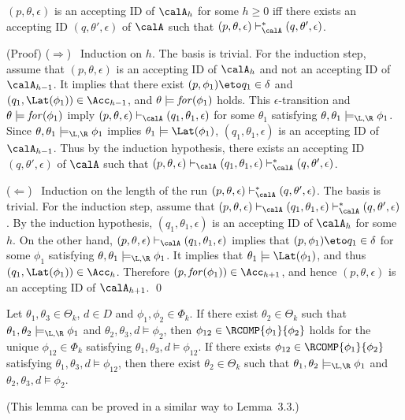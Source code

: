 \begin{lemma}\label{lem:eps1}
$(p,\theta,\epsilon)$ is an accepting ID of $\calA_h$
for some $h\ge0$
iff
there exists an accepting ID $(q,\theta',\epsilon)$ of $\calA$
such that
$(p,\theta,\epsilon)\vdash_{\calA}^* (q,\theta',\epsilon)$.
\end{lemma}
%
(Proof)\quad
($\Rightarrow$) \ Induction on $h$.
The basis is trivial.
For the induction step,
assume that $(p,\theta,\epsilon)$ is an accepting ID of $\calA_h$
and not an accepting ID of $\calA_{h-1}$.
It implies that
there exist ${(p,\phi_1)\eto q_1}\in\delta$ and
$(q_1,\Lat(\phi_1))\in\Acc_{h-1}$, and
$\theta\models\mathit{for}(\phi_1)$ holds.
This $\epsilon$-transition and $\theta\models\mathit{for}(\phi_1)$ imply
$(p,\theta,\epsilon)\vdash_{\calA} (q_1,\theta_1,\epsilon)$
for some $\theta_1$ satisfying $\theta,\theta_1\models_{\L,\R}\phi_1$.
Since $\theta,\theta_1\models_{\L,\R}\phi_1$ implies
$\theta_1\models\Lat(\phi_1)$,
$(q_1,\theta_1,\epsilon)$ is an accepting ID of $\calA_{h-1}$.
Thus by the induction hypothesis,
there exists an accepting ID $(q,\theta',\epsilon)$ of $\calA$
such that
$(p,\theta,\epsilon)\vdash_{\calA} (q_1,\theta_1,\epsilon)
\vdash_{\calA}^* (q,\theta',\epsilon)$.

($\Leftarrow$) \
Induction on the length of the run
$(p,\theta,\epsilon)\vdash_{\calA}^* (q,\theta',\epsilon)$.
The basis is trivial.
For the induction step, assume that
$(p,\theta,\epsilon)\vdash_{\calA}(q_1,\theta_1,\epsilon)
\vdash_{\calA}^* (q,\theta',\epsilon)$.
By the induction hypothesis,
$(q_1,\theta_1,\epsilon)$ is an accepting ID of
$\calA_h$ for some~$h$.
On the other hand,
$(p,\theta,\epsilon)\vdash_{\calA}(q_1,\theta_1,\epsilon)$
implies that
${(p,\phi_1)\eto q_1}\in\delta$ for some $\phi_1$
satisfying $\theta,\theta_1\models_{\L,\R}\phi_1$.
It implies that $\theta_1\models\Lat(\phi_1)$,
and thus $(q_1,\Lat(\phi_1))\in\Acc_h$.
Therefore $(p,\For(\phi_1))\in\Acc_{h+1}$, and hence
$(p,\theta,\epsilon)$ is an accepting ID of $\calA_{h+1}$.
\qed


\begin{lemma}
\label{lem: 4eps}
Let $\theta_1,\theta_3 \in \Theta_k$, $d\in D$ and $\phi_1,\phi_2 \in \Phi_k$.
\lefthang{(i)}
If there exist $\theta_2\in\Theta_k$ such that $\theta_1,\theta_2\models_{\L,\R} \phi_1$
and $\theta_2,\theta_3,d\models \phi_2$, then
$\phi_{12}\in \RCOMP{\phi_1}{\phi_2}$ holds for the unique $\phi_{12}\in \Phi_k$ satisfying
$\theta_1,\theta_3,d\models \phi_{12}$.
If there exists $\phi_{12}\in \RCOMP{\phi_1}{\phi_2}$ satisfying
$\theta_1,\theta_3,d\models \phi_{12}$, then
there exist $\theta_2\in\Theta_k$ such that
$\theta_1,\theta_2\models_{\L,\R} \phi_1$
and $\theta_2,\theta_3,d\models \phi_2$.
\end{lemma}
%
(This lemma can be proved in a similar way to
Lemma~3.3.)


